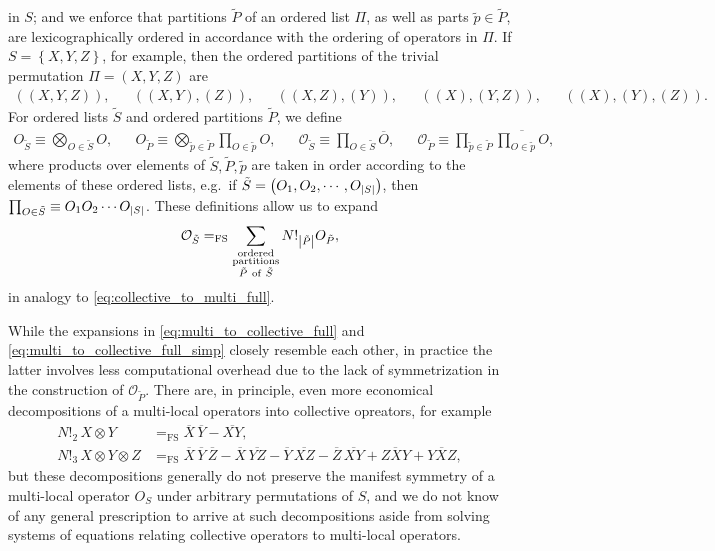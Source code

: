 \documentclass[nofootinbib,notitlepage,11pt]{revtex4-2}
\renewcommand{\t}{\text} %
\newcommand{\p}[1]{\left(#1\right)} %
\renewcommand{\set}[1]{\left\{#1\right\}} %
\newcommand{\1}{\mathds{1}}
\renewcommand{\O}{\mathcal{O}}
\newcommand{\EQFS}{=_{\text{FS}}}
\newcommand{\col}{\overline}
\begin{document}
in $S$; and we enforce that partitions $\tilde P$ of an ordered list
$\Pi$, as well as parts $\tilde p\in\tilde P$, are lexicographically
ordered in accordance with the ordering of operators in $\Pi$.  If
$S=\set{X,Y,Z}$, for example, then the ordered partitions of the
trivial permutation $\Pi=\p{X,Y,Z}$ are
\begin{align}
  \p{\p{X,Y,Z}}, &&
  \p{\p{X,Y},\p{Z}}, &&
  \p{\p{X,Z},\p{Y}}, &&
  \p{\p{X},\p{Y,Z}}, &&
  \p{\p{X},\p{Y},\p{Z}}.
\end{align}
For ordered lists $\tilde S$ and ordered partitions $\tilde P$, we
define
\begin{align}
  O_{\tilde S} \equiv \bigotimes_{O\in\tilde S} O,
  &&
  O_{\tilde P}
  \equiv \bigotimes_{\tilde p\in\tilde P} \prod_{O\in\tilde p} O,
  &&
  \O_{\tilde S} \equiv \prod_{O\in\tilde S} \col{O},
  &&
  \O_{\tilde P}
  \equiv \prod_{\tilde p\in\tilde P}
  \col{\textstyle\prod_{O\in\tilde p} O},
\end{align}
where products over elements of $\tilde S,\tilde P,\tilde p$ are taken
in order according to the elements of these ordered lists, e.g.~if
$\tilde S=\p{O_1,O_2,\cdots,O_{\abs{S}}}$, then
$\prod_{O\in\tilde S}\equiv O_1O_2\cdots O_{\abs{S}}$.  These
definitions allow us to expand
\begin{align}
  \O_{\tilde S} \EQFS
  \sum_{\substack{\t{ordered}\\\t{partitions}\\\tilde P~\t{of}~\tilde S}}
  N!_{\abs{\tilde P}} O_{\tilde P},
\end{align}
in analogy to \eqref{eq:collective_to_multi_full}.

While the expansions in \eqref{eq:multi_to_collective_full} and
\eqref{eq:multi_to_collective_full_simp} closely resemble each other,
in practice the latter involves less computational overhead due to the
lack of symmetrization in the construction of $\O_{\tilde P}$.  There
are, in principle, even more economical decompositions of a
multi-local operators into collective opreators, for example
\begin{align}
  N!_2\, X\otimes Y
  &\EQFS \col{X}\,\col{Y} - \col{XY}, \\
  N!_3\, X\otimes Y \otimes Z
  &\EQFS \col{X}\,\col{Y}\,\col{Z}
  - \col{X}\,\col{YZ} - \col{Y}\,\col{XZ} - \col{Z}\,\col{XY}
  + \col{ZXY} + \col{YXZ},
\end{align}
but these decompositions generally do not preserve the manifest
symmetry of a multi-local operator $O_S$ under arbitrary permutations
of $S$, and we do not know of any general prescription to arrive at
such decompositions aside from solving systems of equations relating
collective operators to multi-local operators.
\end{document}
